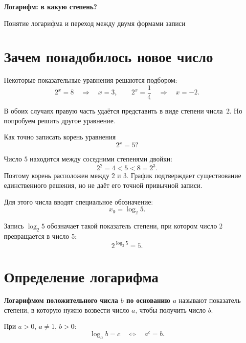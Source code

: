 
\begin{center}
  {\fontsize{25}{30}\selectfont\bfseries\sffamily\color{Primary}
    Логарифм: в какую степень?}

  \vspace{0.3em}

  {\large\sffamily\color{GrayText}
    Понятие логарифма и переход между двумя формами записи}
\end{center}

\vspace{0.45em}

\section{Зачем понадобилось новое число}

Некоторые показательные уравнения решаются подбором:
\[
  2^x=8 \quad\Longrightarrow\quad x=3,
  \qquad
  2^x=\frac14 \quad\Longrightarrow\quad x=-2.
\]

В обоих случаях правую часть удаётся представить в виде степени числа~2.
Но попробуем решить другое уравнение.

\begin{problembox}
  Как точно записать корень уравнения
  \[
    2^x=5?
  \]
\end{problembox}

Число 5 находится между соседними степенями двойки:
\[
  2^2=4<5<8=2^3.
\]
Поэтому корень расположен между 2 и 3. График подтверждает существование
единственного решения, но не даёт его точной привычной записи.

\logmotivationfigure

Для этого числа вводят специальное обозначение:
\[
  x_0=\log_2 5.
\]

\begin{conclusionbox}
  Запись \(\log_2 5\) обозначает такой показатель степени, при котором
  число 2 превращается в число 5:
  \[
    2^{\log_2 5}=5.
  \]
\end{conclusionbox}

\section{Определение логарифма}

\begin{propertybox}[Определение]
  \textbf{Логарифмом положительного числа \(b\) по основанию \(a\)}
  называют показатель степени, в которую нужно возвести число \(a\),
  чтобы получить число \(b\).

  При \(a>0\), \(a\ne1\), \(b>0\):
  \[
    \boxed{\log_a b=c\quad\Longleftrightarrow\quad a^c=b.}
  \]
\end{propertybox}

